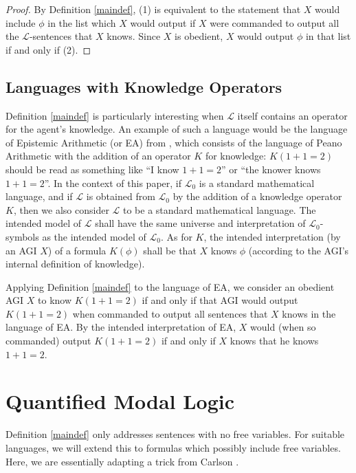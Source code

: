 \documentclass[runningheads]{llncs}
\begin{document}
\begin{proof}
  By Definition \ref{maindef}, (1) is equivalent to the statement that $X$ would
  include $\phi$ in the list which $X$ would output if $X$ were commanded to output
  all the $\mathscr L$-sentences that $X$ knows. Since $X$ is obedient, $X$ would output
  $\phi$ in that list if and only if (2).
\end{proof}

\subsection{Languages with Knowledge Operators}

Definition \ref{maindef} is particularly interesting when $\mathscr L$ itself
contains an operator for the agent's knowledge. An example of such a language would be
the language of Epistemic Arithmetic (or EA) from \cite{shapiro}, which consists of the
language of Peano Arithmetic with the addition of an operator $K$ for knowledge:
$K(1+1=2)$ should be read as something like
``I know $1+1=2$'' or ``the knower knows $1+1=2$''. In the context of this paper,
if $\mathscr L_0$ is a standard mathematical language, and if $\mathscr L$ is obtained
from $\mathscr L_0$ by the addition of a knowledge operator $K$, then we also
consider $\mathscr L$ to be a standard mathematical language. The intended model
of $\mathscr L$ shall have the same universe and interpretation of
$\mathscr L_0$-symbols as the intended model of $\mathscr L_0$. As for $K$,
the intended interpretation (by an AGI $X$) of a formula $K(\phi)$ shall be
that $X$ knows $\phi$ (according to the AGI's internal definition of knowledge).

\begin{example}
Applying Definition \ref{maindef} to the language of EA,
we consider an obedient AGI $X$ to know $K(1+1=2)$ if and only if that AGI would output
$K(1+1=2)$ when commanded to output all sentences that $X$ knows in the language of
EA. By the intended interpretation of
EA, $X$ would (when so commanded)
output $K(1+1=2)$ if and only if $X$ knows that he knows $1+1=2$.
\end{example}

\section{Quantified Modal Logic}
\label{quantifiedsection}

Definition \ref{maindef} only addresses sentences with no free variables.
For suitable languages, we will extend this to formulas which possibly include
free variables. Here, we are essentially adapting a trick from
Carlson \cite{carlson}.
\end{document}
